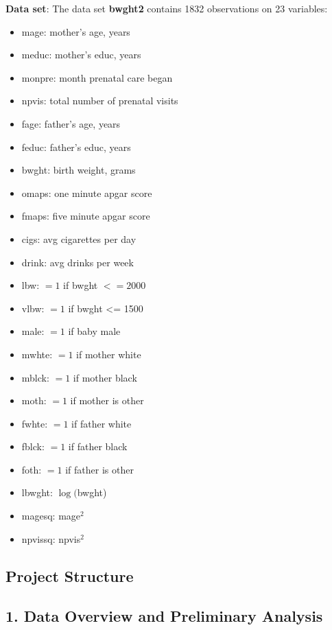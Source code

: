 \documentclass[11pt,a4paper,english]{article}
\begin{document}
\noindent \textbf{Data set}: The data set \textbf{bwght2} contains 1832 observations on 23 variables:
\begin{itemize}[itemsep=-1ex]
    \item mage: mother's age, years
\item meduc: mother's educ, years
\item monpre: month prenatal care began
\item npvis: total number of prenatal visits
\item fage: father's age, years
\item feduc: father's educ, years
\item bwght: birth weight, grams
\item omaps: one minute apgar score
\item fmaps: five minute apgar score
\item cigs: avg cigarettes per day
\item drink: avg drinks per week
\item lbw: $=1$ if bwght $<=2000$
\item vlbw: $=1$ if bwght <= 1500
\item male: $=1$ if baby male
\item mwhte: $=1$ if mother white
\item mblck: $=1$ if mother black
\item moth: $=1$ if mother is other
\item fwhte: $=1$ if father white
\item fblck: $=1$ if father black
\item foth: $=1$ if father is other
\item lbwght: $\log($bwght)
\item magesq: mage$^2$
\item npvissq: npvis$^2$
\end{itemize}



\subsection*{Project Structure}

\subsection*{1. Data Overview and Preliminary Analysis}
\end{document}
